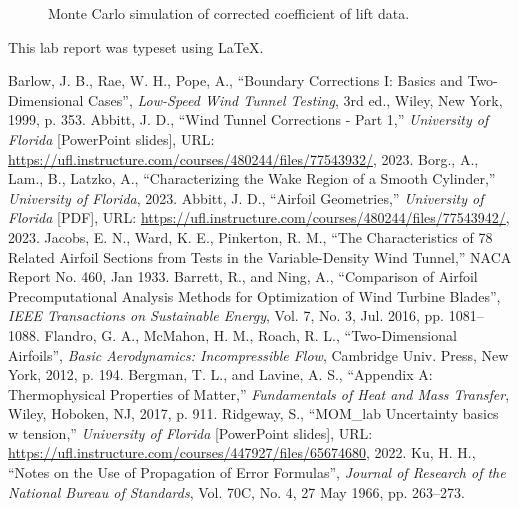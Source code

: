\documentclass[journal,letterpaper]{IEEEtran}
\begin{document}
\begin{figure}[H]
    \centering
    
    \caption{Monte Carlo simulation of corrected coefficient of lift data.}
    \label{fig:Correct}
\end{figure}

\noindent
This lab report was typeset using \LaTeX.

\begin{thebibliography}{99}
     Barlow, J. B., Rae, W. H., Pope, A., ``Boundary Corrections I: Basics and Two-Dimensional Cases'', \textit{Low-Speed Wind Tunnel Testing}, 3rd ed., Wiley, New York, 1999, p. 353.
     Abbitt, J. D., ``Wind Tunnel Corrections - Part 1,'' \textit{University of Florida} [PowerPoint slides], URL: \url{https://ufl.instructure.com/courses/480244/files/77543932/}, 2023.
     Borg., A., Lam., B., Latzko, A., ``Characterizing the Wake Region of a Smooth Cylinder,'' \textit{University of Florida}, 2023.
     Abbitt, J. D., ``Airfoil Geometries,'' \textit{University of Florida} [PDF], URL: \url{https://ufl.instructure.com/courses/480244/files/77543942/}, 2023.
     Jacobs, E. N., Ward, K. E., Pinkerton, R. M., ``The Characteristics of 78 Related Airfoil Sections from Tests in the Variable-Density Wind Tunnel,'' NACA Report No. 460, Jan 1933.
     Barrett, R., and Ning, A., ``Comparison of Airfoil Precomputational Analysis Methods for Optimization of Wind Turbine Blades'', \textit{IEEE Transactions on Sustainable Energy}, Vol. 7, No. 3, Jul. 2016, pp. 1081--1088.
     Flandro, G. A., McMahon, H. M., Roach, R. L., ``Two-Dimensional Airfoils'', \textit{Basic Aerodynamics: Incompressible Flow}, Cambridge Univ. Press, New York, 2012, p. 194.
     Bergman, T. L., and Lavine, A. S., ``Appendix A: Thermophysical Properties of Matter,'' \textit{Fundamentals of Heat and Mass Transfer}, Wiley, Hoboken, NJ, 2017, p. 911.
     Ridgeway, S., ``MOM\_lab Uncertainty basics w tension,'' \textit{University of Florida} [PowerPoint slides], URL: \url{https://ufl.instructure.com/courses/447927/files/65674680}, 2022.
     Ku, H. H., ``Notes on the Use of Propagation of Error Formulas'', \textit{Journal of Research of the National Bureau of Standards}, Vol. 70C, No. 4, 27 May 1966, pp. 263--273.
\end{thebibliography}
\end{document}
